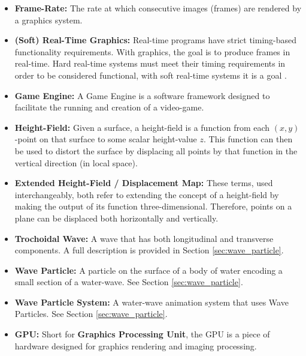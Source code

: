\documentclass[12pt,a4paper,twoside]{report}
\begin{document}
\begin{itemize}

  \item \textbf{Frame-Rate:} The rate at which consecutive images (frames) are
  rendered by a graphics system.

  \item \textbf{(Soft) Real-Time Graphics:} Real-time programs have strict
  timing-based functionality requirements. With graphics, the goal is to
  produce frames in real-time. Hard real-time systems must meet their timing
  requirements in order to be considered functional, with soft real-time
  systems it is a goal \cite{gameenginebook}.

  \item \textbf{Game Engine:} A Game Engine is a software framework designed to
  facilitate the running and creation of a video-game.

  \item \textbf{Height-Field:} Given a surface, a height-field is a function
  from each $(x, y)$-point on that surface to some scalar height-value $z$.
  This function can then be used to distort the surface by displacing all
  points by that function in the vertical direction (in local space).

  \item \textbf{Extended Height-Field / Displacement Map:} These terms, used
  interchangeably, both refer to extending the concept of a height-field by
  making the output of its function three-dimensional. Therefore, points on a
  plane can be displaced both horizontally and vertically.

  \item \textbf{Trochoidal Wave:} A wave that has both longitudinal and
  transverse components. A full description is provided in Section
  \ref{sec:wave_particle}.

  \item \textbf{Wave Particle:} A particle on the surface of a body of water
  encoding a small section of a water-wave. See Section
  \ref{sec:wave_particle}.

  \item \textbf{Wave Particle System:} A water-wave animation system that uses
  Wave Particles. See Section \ref{sec:wave_particle}.

  \item \textbf{GPU:} Short for \textbf{Graphics Processing Unit}, the GPU is a
  piece of hardware designed for graphics rendering and imaging processing.


\end{itemize}
\end{document}
